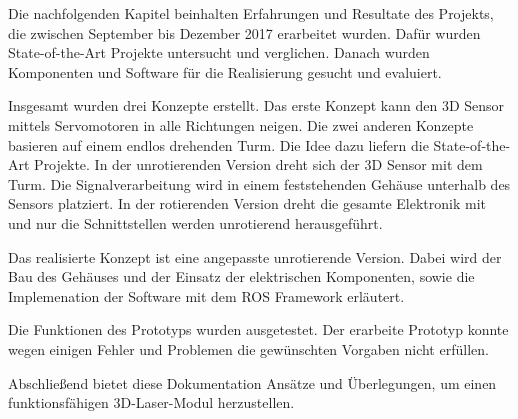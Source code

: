 Die nachfolgenden Kapitel beinhalten Erfahrungen und Resultate des Projekts, die zwischen September bis Dezember 2017 erarbeitet wurden. Dafür wurden State-of-the-Art Projekte untersucht und verglichen. Danach wurden Komponenten und Software für die Realisierung gesucht und evaluiert.

Insgesamt wurden drei Konzepte erstellt. Das erste Konzept kann den 3D Sensor mittels Servomotoren in alle Richtungen neigen. Die zwei anderen Konzepte basieren auf einem endlos drehenden \glqq Turm\grqq. Die Idee dazu liefern die State-of-the-Art Projekte. In der unrotierenden Version dreht sich der 3D Sensor mit dem Turm. Die Signalverarbeitung wird in einem feststehenden Gehäuse unterhalb des Sensors platziert. In der rotierenden Version dreht die gesamte Elektronik mit und nur die Schnittstellen werden unrotierend herausgeführt.

Das realisierte Konzept ist eine angepasste unrotierende Version. Dabei wird der Bau des Gehäuses und der Einsatz der elektrischen Komponenten, sowie die Implemenation der Software mit dem ROS Framework erläutert.

Die Funktionen des Prototyps wurden ausgetestet. Der erarbeite Prototyp konnte wegen einigen Fehler und Problemen die gewünschten Vorgaben nicht erfüllen. 

Abschließend bietet diese Dokumentation Ansätze und Überlegungen, um einen funktionsfähigen 3D-Laser-Modul herzustellen.